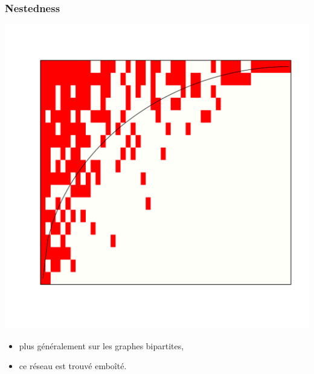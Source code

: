 \documentclass[nopagenumber,9pt]{beamer}
\begin{document}
\begin{frame}
 \frametitle{Nestedness}
 
 \begin{center}
  \includegraphics[scale=.3]{plots/chilean_nested.pdf}
 \end{center}


 \begin{itemize}
  \item plus généralement sur les graphes bipartites,
  \item ce réseau est trouvé embo\^ité.
 
 \end{itemize}

 \end{frame}
\end{document}
